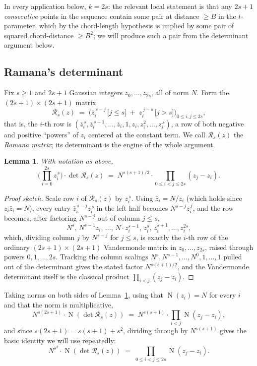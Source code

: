 \documentclass[11pt]{amsart}
\newtheorem{lemma}[theorem]{Lemma}
\theoremstyle{definition}
\theoremstyle{remark}
\DeclareMathOperator{\Nm}{N}
\newcommand{\nm}[1]{\Nm(#1)}
\begin{document}
In every application below, $k=2s$: the relevant local statement is that any $2s+1$ \emph{consecutive} points in the sequence contain some pair at distance $\ge B$ in the $t$-parameter, which by the chord-length hypothesis is implied by some pair of squared chord-distance $\ge B^2$; we will produce such a pair from the determinant argument below.

\subsection{Ramana's determinant}

Fix $s\ge 1$ and $2s+1$ Gaussian integers $z_0,\dots,z_{2s}$, all of norm $N$. Form the $(2s+1)\times(2s+1)$ matrix
\[
\mathcal R_s(z) \;=\; \Big( \bar z_i^{\,s-j} \,\big[ j\le s\big] \;+\; z_i^{\,j-s}\,\big[j>s\big] \Big)_{0\le i,j\le 2s},
\]
that is, the $i$-th row is $(\bar z_i^{\,s},\bar z_i^{\,s-1},\dots,\bar z_i,1,z_i,z_i^2,\dots,z_i^{\,s})$, a row of both negative and positive ``powers'' of $z_i$ centered at the constant term. We call $\mathcal R_s(z)$ the \emph{Ramana matrix}; its determinant is the engine of the whole argument.

\begin{lemma}\label{lem:ramana}
With notation as above,
\[
\Big(\prod_{i=0}^{2s} z_i^{\,s}\Big)\cdot \det \mathcal R_s(z) \;=\; N^{s(s+1)/2}\cdot \prod_{0\le i<j\le 2s} (z_j-z_i).
\]
\end{lemma}

\begin{proof}[Proof sketch]
Scale row $i$ of $\mathcal R_s(z)$ by $z_i^{\,s}$. Using $\bar z_i = N/z_i$ (which holds since $z_i\bar z_i=N$), every entry $\bar z_i^{\,s-j}z_i^{\,s}$ in the left half becomes $N^{s-j}z_i^{\,j}$, and the row becomes, after factoring $N^{s-j}$ out of column $j\le s$,
\[
N^{s},\,N^{s-1}z_i,\,\dots,\,N\cdot z_i^{s-1},\,z_i^s,\,z_i^{s+1},\dots,z_i^{2s},
\]
which, dividing column $j$ by $N^{s-j}$ for $j\le s$, is exactly the $i$-th row of the ordinary $(2s+1)\times(2s+1)$ Vandermonde matrix in $z_0,\dots,z_{2s}$, raised through powers $0,1,\dots,2s$. Tracking the column scalings $N^{s},N^{s-1},\dots,N^0,1,\dots,1$ pulled out of the determinant gives the stated factor $N^{s(s+1)/2}$, and the Vandermonde determinant itself is the classical product $\prod_{i<j}(z_j-z_i)$.
\end{proof}

Taking norms on both sides of Lemma~\ref{lem:ramana}, using that $\nm{z_i}=N$ for every $i$ and that the norm is multiplicative,
\[
N^{s(2s+1)} \cdot \nm{\det\mathcal R_s(z)} \;=\; N^{s(s+1)}\cdot \prod_{i<j} \nm{z_j-z_i},
\]
and since $s(2s+1) = s(s+1)+s^2$, dividing through by $N^{s(s+1)}$ gives the basic identity we will use repeatedly:
\begin{equation}\label{eq:basic-det}
N^{s^2} \cdot \nm{\det \mathcal R_s(z)} \;=\; \prod_{0\le i<j\le 2s} \nm{z_j-z_i}.
\end{equation}
\end{document}
